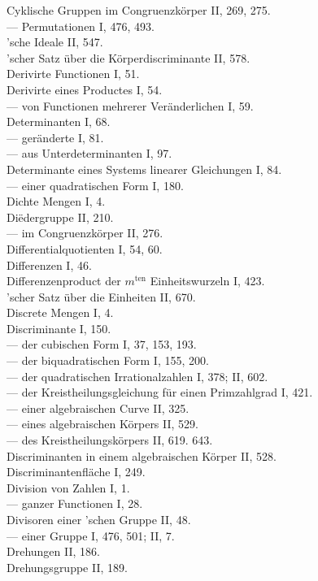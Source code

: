 \noindent
Cyklische Gruppen im Congruenzk\"orper II, 269, 275.\\
--- Permutationen I, 476, 493.\\

\medskip
\noindent
{}'sche Ideale II, 547.\\
'scher Satz \"uber die K\"orperdiscriminante II, 578.\\
Derivirte Functionen I, 51.\\
Derivirte eines Productes I, 54.\\
--- von Functionen mehrerer Ver\"anderlichen I, 59.\\
Determinanten I, 68.\\
--- ger\"anderte I, 81.\\
--- aus Unterdeterminanten I, 97.\\
Determinante eines Systems linearer Gleichungen I, 84.\\
--- einer quadratischen Form I, 180.\\
Dichte Mengen I, 4.\\
Di\"edergruppe II, 210.\\
--- im Congruenzk\"orper II, 276.\\
Differentialquotienten I, 54, 60.\\
Differenzen I, 46.\\
Differenzenproduct der $m^{\text{ten}}$ Einheitswurzeln I, 423.\\
'scher Satz \"uber die Einheiten II, 670.\\
Discrete Mengen I, 4.\\
Discriminante I, 150.\\
--- der cubischen Form I, 37, 153, 193.\\
--- der biquadratischen Form I, 155, 200.\\
--- der quadratischen Irrationalzahlen I, 378; II, 602.\\
--- der Kreistheilungsgleichung f\"ur einen Primzahlgrad I, 421.\\
--- einer algebraischen Curve II, 325.\\
--- eines algebraischen K\"orpers II, 529.\\
--- des Kreistheilungsk\"orpers II, 619. 643.\\ %
Discriminanten in einem algebraischen K\"orper II, 528.\\
Discriminantenfl\"ache I, 249.\\
Division von Zahlen I, 1.\\
--- ganzer Functionen I, 28.\\
Divisoren einer 'schen Gruppe II, 48.\\
--- einer Gruppe I, 476, 501; II, 7.\\
Drehungen II, 186.\\
Drehungsgruppe II, 189.\\

